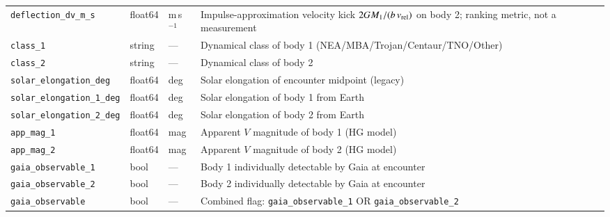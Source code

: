 \documentclass{aa}
\begin{document}
\begin{table}
\begin{tabular}{p{}p{}p{}p{}}
\texttt{deflection\_dv\_m\_s} & float64 & m\,s$^{-1}$ & Impulse-approximation velocity kick $2GM_1/(b\,v_{\rm rel})$ on body 2; ranking metric, not a measurement \\
\texttt{class\_1} & string & --- & Dynamical class of body 1 (NEA/MBA/Trojan/Centaur/TNO/Other) \\
\texttt{class\_2} & string & --- & Dynamical class of body 2 \\
\texttt{solar\_elongation\_deg} & float64 & deg & Solar elongation of encounter midpoint (legacy) \\
\texttt{solar\_elongation\_1\_deg} & float64 & deg & Solar elongation of body 1 from Earth \\
\texttt{solar\_elongation\_2\_deg} & float64 & deg & Solar elongation of body 2 from Earth \\
\texttt{app\_mag\_1} & float64 & mag & Apparent $V$ magnitude of body 1 (HG model) \\
\texttt{app\_mag\_2} & float64 & mag & Apparent $V$ magnitude of body 2 (HG model) \\
\texttt{gaia\_observable\_1} & bool & --- & Body 1 individually detectable by Gaia at encounter \\
\texttt{gaia\_observable\_2} & bool & --- & Body 2 individually detectable by Gaia at encounter \\
\texttt{gaia\_observable} & bool & --- & Combined flag: \texttt{gaia\_observable\_1} OR \texttt{gaia\_observable\_2} \\
\hline
\end{tabular}
\end{table}
\end{document}
